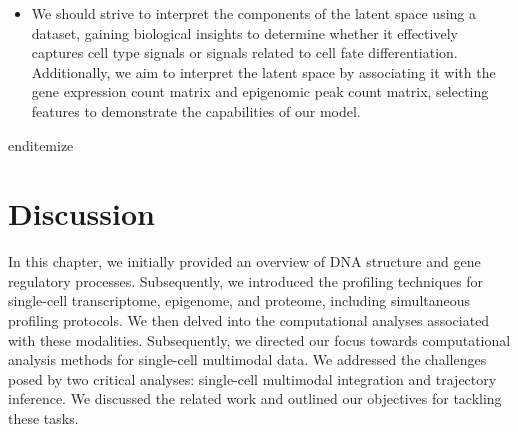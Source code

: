 \begin{itemize}
	\item
	We should strive to interpret the components of the latent space using a dataset, gaining biological insights to determine whether it effectively captures cell type signals or signals related to cell fate differentiation. Additionally, we aim to interpret the latent space by associating it with the gene expression count matrix and epigenomic peak count matrix, selecting features to demonstrate the capabilities of our model.
\end{itemize}
\FloatBarrier %
end{itemize}


\section{Discussion}
\label{bgInte:Discussion}
In this chapter, we initially provided an overview of DNA structure and gene regulatory processes. Subsequently, we introduced the profiling techniques for single-cell transcriptome, epigenome, and proteome, including simultaneous profiling protocols. We then delved into the computational analyses associated with these modalities. Subsequently, we directed our focus towards computational analysis methods for single-cell multimodal data. We addressed the challenges posed by two critical analyses: single-cell multimodal integration and trajectory inference. We discussed the related work and outlined our objectives for tackling these tasks.
